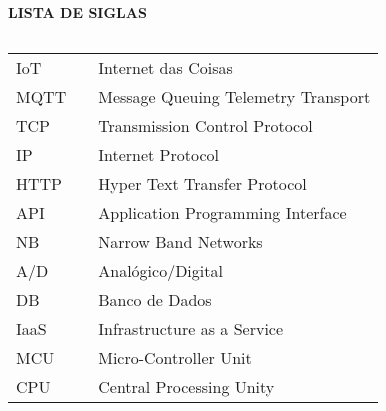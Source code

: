 \newpage

\begin{center}
\textbf{LISTA DE SIGLAS}
\end{center}
$\!$\\

\begin{tabular}{lll}
IoT & \hspace{1cm} & Internet das Coisas \\
MQTT & \hspace{1cm} & Message Queuing Telemetry Transport \\
TCP & \hspace{1cm} & Transmission Control Protocol \\
IP & \hspace{1cm} & Internet Protocol \\
HTTP & \hspace{1cm} & Hyper Text Transfer Protocol \\
API & \hspace{1cm} & Application Programming Interface \\
NB &\hspace{1cm} &  Narrow Band Networks \\
A/D & \hspace{1cm} & Analógico/Digital \\
DB &  \hspace{1cm} & Banco de Dados \\
IaaS & \hspace{1cm} & Infrastructure as a Service \\
MCU & \hspace{1cm} & Micro-Controller Unit \\
CPU & \hspace{1cm} & Central Processing Unity \\


\end{tabular}
